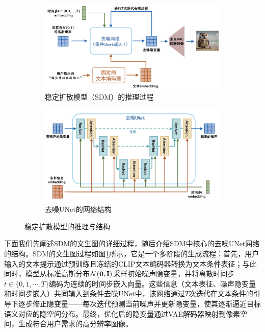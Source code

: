 \documentclass[11pt,a4paper,UTF8]{ctexart}
\begin{document}
\begin{figure}[htbp]
    \centering
    \begin{subfigure}[b]{0.49\textwidth}
        \centering
        \includegraphics[width=\linewidth]{img/SDM.jpg}
        \caption{稳定扩散模型（SDM）的推理过程}
        \label{fig:sdm}
    \end{subfigure}
    \hfill
    \begin{subfigure}[b]{0.49\textwidth}
        \centering
        \includegraphics[width=\linewidth]{img/denoising-unet.jpg}
        \caption{去噪UNet的网络结构}
        \label{fig:unet}
    \end{subfigure}
    \caption{稳定扩散模型的推理与结构}
    \label{fig:sdm&unet}
\end{figure}

下面我们先阐述SDM的文生图的详细过程，随后介绍SDM中核心的去噪UNet网络的结构。SDM的文生图过程如图\ref{fig:sdm}所示，它是一个多阶段的生成流程：首先，用户输入的文本提示通过预训练且冻结的CLIP文本编码器转换为文本条件表征；与此同时，模型从标准高斯分布$\mathcal{N}(\mathbf{0},\mathbf{I})$采样初始噪声隐变量，并将离散时间步$t\in\{0,1,\cdots,T\}$编码为连续的时间步嵌入向量。这些信息（文本表征、噪声隐变量和时间步嵌入）共同输入到条件去噪UNet中，该网络通过$T$次迭代在文本条件的引导下逐步修正隐变量——每次迭代预测当前噪声并更新隐变量，使其逐渐逼近目标语义对应的隐空间分布。最终，优化后的隐变量通过VAE解码器映射到像素空间，生成符合用户需求的高分辨率图像。
\end{document}
